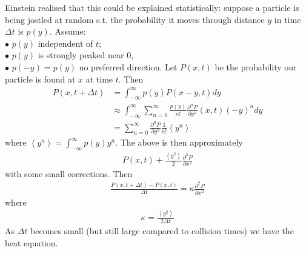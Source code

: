 \documentclass[a4paper]{article}
\begin{document}
Einstein realised that this could be explained statistically: suppose a particle is being jostled at random s.t. the probability it moves through distance $y$ in time $\Delta t$ is $p\left(y\right)$. Assume:\\
$\bullet$ $p\left(y\right)$ independent of $t$;\\
$\bullet$ $p\left(y\right)$ is strongly peaked near $0$,\\
$\bullet$ $p\left(-y\right) = p\left(y\right)$ no preferred direction.
Let $P\left(x,t\right)$ be the probability our particle is found at $x$ at time $t$. Then
\begin{equation*}
\begin{aligned}
P\left(x,t + \Delta t\right) &= \int_{-\infty}^\infty p\left(y\right) P\left(x-y,t\right) dy\\
&\approx \int_{-\infty}^\infty \sum_{n=0}^\infty \frac{p\left(y\right)}{n!} \frac{\partial^n P}{\partial y^n} \left(x,t\right)\left(-y\right)^n dy\\
&= \sum_{n=0}^\infty \frac{\partial^n P}{\partial y^n} \frac{1}{n!} \left<y^n\right>
\end{aligned}
\end{equation*}
where $\left<y^n\right> = \int_{-\infty}^\infty p\left(y\right) y^n$. The above is then approximately
\begin{equation*}
\begin{aligned}
P\left(x,t\right) + \frac{\left<y^2\right>}{2} \frac{\partial^2 P}{\partial x^2}
\end{aligned}
\end{equation*}
with some small corrections. Then
\begin{equation*}
\begin{aligned}
\frac{P\left(x,t+\Delta t\right) - P\left(x,t\right)}{\Delta t} = \kappa \frac{\partial^2 P}{\partial x^2}
\end{aligned}
\end{equation*}
where
\begin{equation*}
\begin{aligned}
\kappa = \frac{\left<y^2\right>}{2\Delta t}
\end{aligned}
\end{equation*}
As $\Delta t$ becomes small (but still large compared to collision times) we have the heat equation.

\end{document}
